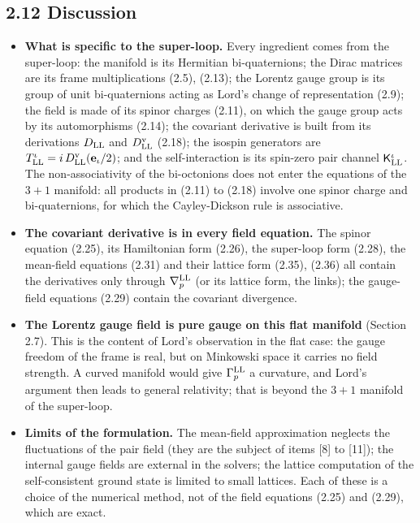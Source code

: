 \documentclass[
  10pt,
]{article}
\providecommand{\tightlist}{%
  \setlength{\itemsep}{0pt}\setlength{\parskip}{0pt}}
\begin{document}
\hypertarget{discussion}{%
\subsection{2.12 Discussion}\label{discussion}}

\begin{itemize}
\tightlist
\item
  \textbf{What is specific to the super-loop.} Every ingredient comes
  from the super-loop: the manifold is its Hermitian bi-quaternions; the
  Dirac matrices are its frame multiplications (2.5), (2.13); the
  Lorentz gauge group is its group of unit bi-quaternions acting as
  Lord's change of representation (2.9); the field is made of its spinor
  charges (2.11), on which the gauge group acts by its automorphisms
  (2.14); the covariant derivative is built from its derivations
  \(D_{\rm LL}\) and \(D^{\rm v}_{\rm LL}\) (2.18); the isospin
  generators are
  \(T^\iota_{\rm LL}=i\,D^{\rm v}_{\rm LL}(\mathbf e_\iota/2)\); and the
  self-interaction is its spin-zero pair channel
  \(\mathsf K^\iota_{\rm LL}\). The non-associativity of the
  bi-octonions does not enter the equations of the \(3+1\) manifold: all
  products in (2.11) to (2.18) involve one spinor charge and
  bi-quaternions, for which the Cayley-Dickson rule is associative.
\item
  \textbf{The covariant derivative is in every field equation.} The
  spinor equation (2.25), its Hamiltonian form (2.26), the super-loop
  form (2.28), the mean-field equations (2.31) and their lattice form
  (2.35), (2.36) all contain the derivatives only through
  \(\nabla^{\rm LL}_p\) (or its lattice form, the links); the
  gauge-field equations (2.29) contain the covariant divergence.
\item
  \textbf{The Lorentz gauge field is pure gauge on this flat manifold}
  (Section 2.7). This is the content of Lord's observation in the flat
  case: the gauge freedom of the frame is real, but on Minkowski space
  it carries no field strength. A curved manifold would give
  \(\Gamma^{\rm LL}_p\) a curvature, and Lord's argument then leads to
  general relativity; that is beyond the \(3+1\) manifold of the
  super-loop.
\item
  \textbf{Limits of the formulation.} The mean-field approximation
  neglects the fluctuations of the pair field (they are the subject of
  items {[}8{]} to {[}11{]}); the internal gauge fields are external in
  the solvers; the lattice computation of the self-consistent ground
  state is limited to small lattices. Each of these is a choice of the
  numerical method, not of the field equations (2.25) and (2.29), which
  are exact.
\end{itemize}
\end{document}
